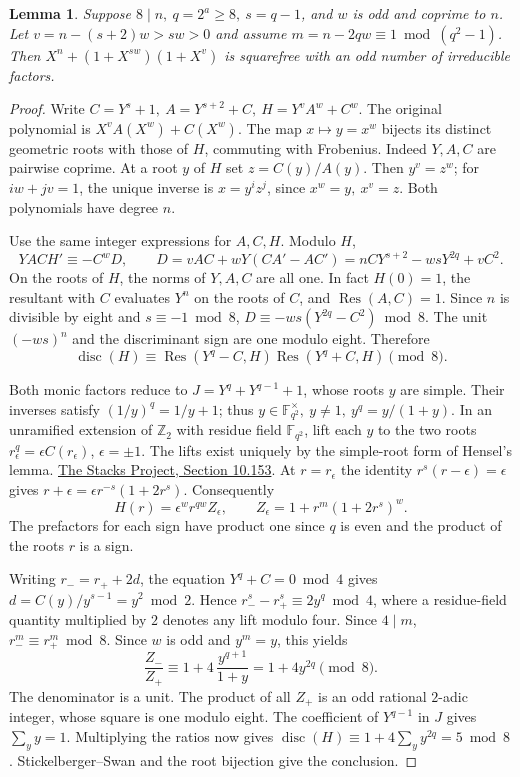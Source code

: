 \documentclass[11pt]{article}
\newtheorem{lemma}[theorem]{Lemma}
\begin{document}
\begin{lemma}\label{lem:joint-even-disc}
Suppose \(8\mid n,\ q=2^a\ge8,\ s=q-1\), and \(w\) is odd and
coprime to \(n\). Let \(v=n-(s+2)w>sw>0\) and assume
\(m=n-2qw\equiv1\bmod(q^2-1)\).
Then \(X^n+(1+X^{sw})(1+X^v)\) is squarefree with an odd number
of irreducible factors.
\end{lemma}
\begin{proof}
Write \(C=Y^s+1,\ A=Y^{s+2}+C,\ H=Y^vA^w+C^w\).
The original polynomial is \(X^v A(X^w)+C(X^w)\).
The map \(x\mapsto y=x^w\) bijects its distinct geometric roots
with those of \(H\), commuting with Frobenius.
Indeed \(Y,A,C\) are pairwise coprime. At a root \(y\) of \(H\)
set \(z=C(y)/A(y)\). Then \(y^v=z^w\);
for \(iw+jv=1\), the unique inverse is \(x=y^iz^j\), since
\(x^w=y,\ x^v=z\). Both polynomials have degree \(n\).

Use the same integer expressions for \(A,C,H\). Modulo \(H\),
\[
 YAC H'\equiv-C^w D,\qquad D=vAC+wY(CA'-AC')
 =nCY^{s+2}-wsY^{2q}+vC^2.
\]
On the roots of \(H\), the norms of \(Y,A,C\) are all one.
In fact \(H(0)=1\), the resultant with \(C\) evaluates \(Y^n\)
on the roots of \(C\), and \(\operatorname{Res}(A,C)=1\).
Since \(n\) is divisible by eight and \(s\equiv-1\bmod8\),
\(D\equiv-ws(Y^{2q}-C^2)\bmod8\). The unit \((-ws)^n\) and
the discriminant sign are one modulo eight. Therefore
\[
 \operatorname{disc}(H)\equiv
 \operatorname{Res}(Y^q-C,H)\operatorname{Res}(Y^q+C,H)\pmod8 .
\]

Both monic factors reduce to \(J=Y^q+Y^{q-1}+1\), whose roots
\(y\) are simple. Their inverses satisfy \((1/y)^q=1/y+1\);
thus \(y\in\mathbb F_{q^2}^\times,\ y\ne1,\ y^q=y/(1+y)\).
In an unramified extension of \(\mathbb Z_2\) with residue field
\(\mathbb F_{q^2}\), lift each \(y\) to the two roots
\(r_\epsilon^q=\epsilon C(r_\epsilon)\), \(\epsilon=\pm1\).
The lifts exist uniquely by the simple-root form of Hensel's lemma.
\href{https://stacks.math.columbia.edu/tag/04GE}{The Stacks Project, Section 10.153}.
At \(r=r_\epsilon\) the identity \(r^s(r-\epsilon)=\epsilon\)
gives \(r+\epsilon=\epsilon r^{-s}(1+2r^s)\).
Consequently
\[
 H(r)=\epsilon^w r^{qw}Z_\epsilon,\qquad
 Z_\epsilon=1+r^m(1+2r^s)^w .
\]
The prefactors for each sign have product one since \(q\) is even
and the product of the roots \(r\) is a sign.

Writing \(r_-=r_++2d\), the equation \(Y^q+C=0\bmod4\)
gives \(d=C(y)/y^{s-1}=y^2\bmod2\).
Hence \(r_-^s-r_+^s\equiv2y^q\bmod4\), where a residue-field
quantity multiplied by \(2\) denotes any lift modulo four.
Since \(4\mid m\), \(r_-^m\equiv r_+^m\bmod8\).
Since \(w\) is odd and \(y^m=y\), this yields
\[
 \frac{Z_-}{Z_+}\equiv 1+4\,\frac{y^{q+1}}{1+y}
       =1+4y^{2q}\pmod8.
\]
The denominator is a unit. The product of all \(Z_+\) is an
odd rational \(2\)-adic integer, whose square is one modulo eight.
The coefficient of \(Y^{q-1}\) in \(J\) gives \(\sum_y y=1\).
Multiplying the ratios now gives
\(\operatorname{disc}(H)\equiv1+4\sum_y y^{2q}=5\bmod8\).
Stickelberger--Swan and the root bijection give the conclusion.
\end{proof}
\end{document}
